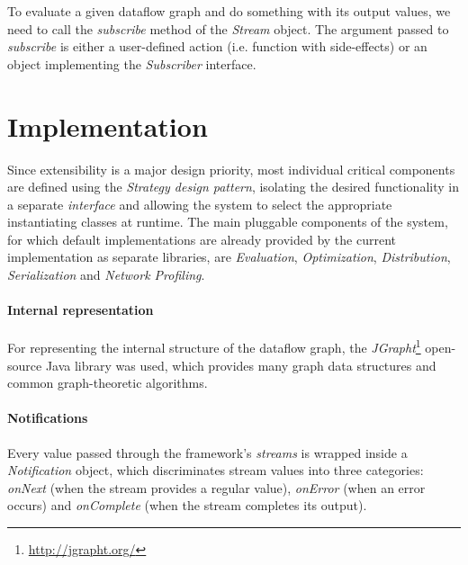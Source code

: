 \documentclass[sigplan,review,anonymous,screen]{acmart}
\begin{document}

To evaluate a given dataflow graph and do something with its output values, we
need to call the \textit{subscribe} method of the \textit{Stream} object. The
argument passed to \textit{subscribe} is either a user-defined action (i.e.
function with side-effects) or an object implementing the \textit{Subscriber}
interface.
%

\section{Implementation} \label{sec:implementation}

Since extensibility is a major design priority, most individual critical
components are defined using the \textit{Strategy design pattern}, isolating the desired
functionality in a separate \textit{interface} and allowing the system to select the
appropriate instantiating classes at runtime. The main pluggable components of the system,
for which default implementations are already provided by the current implementation as separate
libraries, are \textit{Evaluation}, \textit{Optimization}, \textit{Distribution}, \textit{Serialization}
and \textit{Network Profiling}.

\paragraph{Internal representation}
For representing the internal structure of the dataflow graph, the
\textit{JGrapht}\footnote{\url{http://jgrapht.org/}} open-source Java library was used, which provides many graph
data structures and common graph-theoretic algorithms.

\paragraph{Notifications}
Every value passed through the framework's
\textit{streams} is wrapped inside a \textit{Notification} object, which
discriminates stream values into three categories: \textit{onNext} (when the
stream provides a regular value), \textit{onError} (when an error occurs) and
\textit{onComplete} (when the stream completes its output).
\end{document}
